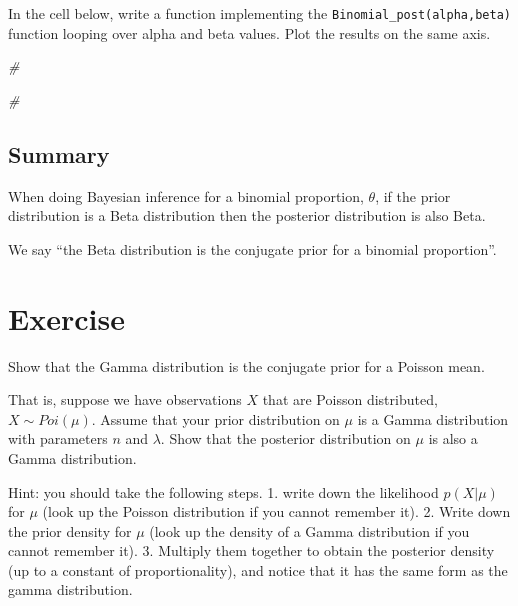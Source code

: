 \documentclass[
]{article}
\newenvironment{Shaded}{\begin{snugshade}}{\end{snugshade}}
\newcommand{\CommentTok}[1]{\textcolor[rgb]{0.56,0.35,0.01}{\textit{#1}}}
\begin{document}
In the cell below, write a function implementing the
\texttt{Binomial\_post(alpha,beta)} function looping over alpha and beta
values. Plot the results on the same axis.

\begin{Shaded}
\begin{Highlighting}[]
\CommentTok{#}

\CommentTok{#}
\end{Highlighting}
\end{Shaded}

\hypertarget{summary}{%
\subsection{Summary}\label{summary}}

When doing Bayesian inference for a binomial proportion, \(\theta\), if
the prior distribution is a Beta distribution then the posterior
distribution is also Beta.

We say ``the Beta distribution is the conjugate prior for a binomial
proportion''.

\hypertarget{exercise}{%
\section{Exercise}\label{exercise}}

Show that the Gamma distribution is the conjugate prior for a Poisson
mean.

That is, suppose we have observations \(X\) that are Poisson
distributed, \(X \sim Poi(\mu)\). Assume that your prior distribution on
\(\mu\) is a Gamma distribution with parameters \(n\) and \(\lambda\).
Show that the posterior distribution on \(\mu\) is also a Gamma
distribution.

Hint: you should take the following steps. 1. write down the likelihood
\(p(X|\mu)\) for \(\mu\) (look up the Poisson distribution if you cannot
remember it). 2. Write down the prior density for \(\mu\) (look up the
density of a Gamma distribution if you cannot remember it). 3. Multiply
them together to obtain the posterior density (up to a constant of
proportionality), and notice that it has the same form as the gamma
distribution.
\end{document}
